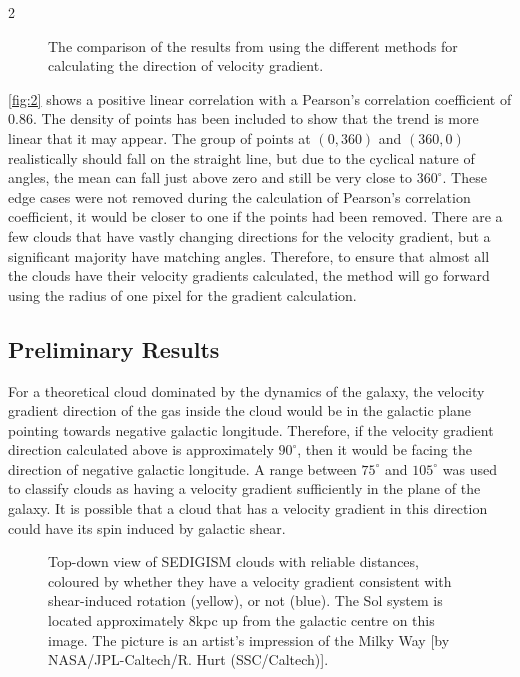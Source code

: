 \documentclass[a4paper,11pt]{article}
\begin{document}
\begin{multicols}{2}
\begin{figure}[H]
  \centering
  
  \caption{The comparison of the results from using the different methods for calculating the direction of velocity gradient.\label{fig:2}}
  \vspace{-1em}
\end{figure}

\par\noindent \autoref{fig:2} shows a positive linear correlation with a Pearson's correlation coefficient of 0.86. The density of points has been included to show that the trend is more linear that it may appear. The group of points at $\left(0, 360\right)$ and $\left(360, 0\right)$ realistically should fall on the straight line, but due to the cyclical nature of angles, the mean can fall just above zero and still be very close to $360^{\circ}$. These edge cases were not removed during the calculation of Pearson's correlation coefficient, it would be closer to one if the points had been removed. There are a few clouds that have vastly changing directions for the velocity gradient, but a significant majority have matching angles. Therefore, to ensure that almost all the clouds have their velocity gradients calculated, the method will go forward using the radius of one pixel for the gradient calculation.

\subsection*{Preliminary Results}

\par\noindent For a theoretical cloud dominated by the dynamics of the galaxy, the velocity gradient direction of the gas inside the cloud would be in the galactic plane pointing towards negative galactic longitude. Therefore, if the velocity gradient direction calculated above is approximately $90^{\circ}$, then it would be facing the direction of negative galactic longitude. A range between $75^{\circ}$ and $105^{\circ}$ was used to classify clouds as having a velocity gradient sufficiently in the plane of the galaxy. It is possible that a cloud that has a velocity gradient in this direction could have its spin induced by galactic shear.

\begin{figure}[H]
  \centering
  
  \caption{Top-down view of SEDIGISM clouds with reliable distances, coloured by whether they have a velocity gradient consistent with shear-induced rotation (yellow), or not (blue). The Sol system is located approximately 8kpc up from the galactic centre on this image. The picture is an artist's impression of the Milky Way [by NASA/JPL-Caltech/R. Hurt (SSC/Caltech)].\label{fig:3}}
  \vspace{-0.7em}
\end{figure}


\end{multicols}
\end{document}
